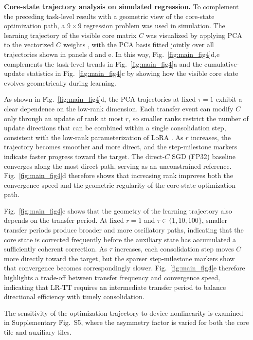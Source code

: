 \documentclass[fleqn,10pt]{wlscirep}
\begin{document}
\noindent\textbf{Core-state trajectory analysis on simulated regression.}
To complement the preceding task-level results with a geometric view of the core-state optimization path, a \(9\times9\) regression problem was used in simulation. The learning trajectory of the visible core matrix \(C\) was visualized by applying PCA to the vectorized \(C\) weights \cite{lorch2016visualizing,li2018visualizing}, with the PCA basis fitted jointly over all trajectories shown in panels d and e. In this way, Fig.~\ref{fig:main_fig4}d,e complements the task-level trends in Fig.~\ref{fig:main_fig4}a and the cumulative-update statistics in Fig.~\ref{fig:main_fig4}c by showing how the visible core state evolves geometrically during learning.

As shown in Fig.~\ref{fig:main_fig4}d, the PCA trajectories at fixed \(\tau=1\) exhibit a clear dependence on the low-rank dimension. Each transfer event can modify \(C\) only through an update of rank at most \(r\), so smaller ranks restrict the number of update directions that can be combined within a single consolidation step, consistent with the low-rank parameterization of LoRA \cite{hu2021lora}. As \(r\) increases, the trajectory becomes smoother and more direct, and the step-milestone markers indicate faster progress toward the target. The direct-\(C\) SGD (FP32) baseline converges along the most direct path, serving as an unconstrained reference. Fig.~\ref{fig:main_fig4}d therefore shows that increasing rank improves both the convergence speed and the geometric regularity of the core-state optimization path.

Fig.~\ref{fig:main_fig4}e shows that the geometry of the learning trajectory also depends on the transfer period. At fixed \(r=1\) and \(\tau\in\{1,10,100\}\), smaller transfer periods produce broader and more oscillatory paths, indicating that the core state is corrected frequently before the auxiliary state has accumulated a sufficiently coherent correction. As \(\tau\) increases, each consolidation step moves \(C\) more directly toward the target, but the sparser step-milestone markers show that convergence becomes correspondingly slower. Fig.~\ref{fig:main_fig4}e therefore highlights a trade-off between transfer frequency and convergence speed, indicating that LR-TT requires an intermediate transfer period to balance directional efficiency with timely consolidation.

The sensitivity of the optimization trajectory to device nonlinearity is examined in Supplementary Fig.~S5, where the asymmetry factor is varied for both the core tile and auxiliary tiles.
\end{document}
